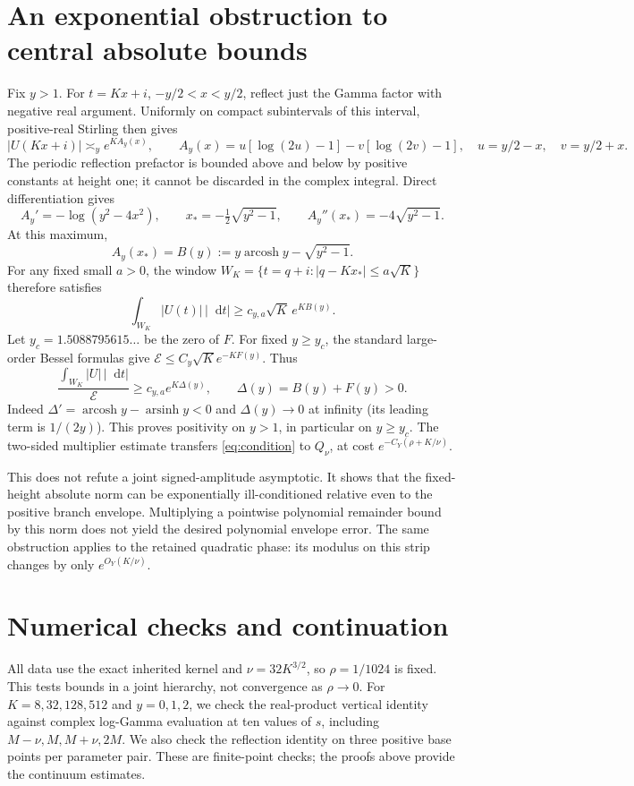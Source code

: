 \documentclass[11pt,a4paper]{article}
\newcommand{\dd}{\mathop{}\!\mathrm d}
\newcommand{\E}{\mathcal E}
\begin{document}
\section{An exponential obstruction to central absolute bounds}
Fix \(y>1\). For \(t=Kx+i\), \(-y/2<x<y/2\), reflect just the
Gamma factor with negative real argument. Uniformly on compact
subintervals of this interval, positive-real Stirling then gives
\[
 |U(Kx+i)|\asymp_y e^{KA_y(x)},\qquad
 A_y(x)=u[\log(2u)-1]-v[\log(2v)-1],
 \quad u=y/2-x,\quad v=y/2+x.
\]
The periodic reflection prefactor is bounded above and below by
positive constants at height one; it cannot be discarded in the
complex integral. Direct differentiation gives
\[
 A_y'=-\log(y^2-4x^2),\qquad
 x_*=-\tfrac12\sqrt{y^2-1},\qquad A_y''(x_*)=-4\sqrt{y^2-1}.
\]
At this maximum,
\[
 A_y(x_*)=B(y):=y\operatorname{arcosh}y-\sqrt{y^2-1}.
\]
For any fixed small \(a>0\), the window
\(W_K=\{t=q+i:|q-Kx_*|\le a\sqrt K\}\) therefore satisfies
\[
 \int_{W_K}|U(t)|\,|\dd t|\ge c_{y,a}\sqrt K\,e^{KB(y)}.
\]
Let \(y_c=1.5088795615\ldots\) be the zero of \(F\).
For fixed \(y\ge y_c\), the standard large-order Bessel formulas
\cite{Bessel} give
\(\E\le C_y\sqrt K e^{-KF(y)}\).
Thus
\begin{equation}\label{eq:condition}
 \frac{\int_{W_K}|U|\,|\dd t|}{\E}
 \ge c_{y,a}e^{K\Delta(y)},\qquad \Delta(y)=B(y)+F(y)>0.
\end{equation}
Indeed \(\Delta'=\operatorname{arcosh}y-\operatorname{arsinh}y<0\)
and \(\Delta(y)\to0\) at infinity (its leading term is \(1/(2y)\)).
This proves positivity on \(y>1\), in particular on \(y\ge y_c\).
The two-sided multiplier estimate transfers \eqref{eq:condition}
to \(Q_\nu\), at cost \(e^{-C_Y(\rho+K/\nu)}\).

This does not refute a joint signed-amplitude asymptotic.
It shows that the fixed-height absolute norm can be exponentially
ill-conditioned relative even to the positive branch envelope.
Multiplying a pointwise polynomial remainder bound by this norm
does not yield the desired polynomial envelope error.
The same obstruction applies to the retained quadratic phase:
its modulus on this strip changes by only \(e^{O_Y(K/\nu)}\).

\section{Numerical checks and continuation}
All data use the exact inherited kernel and
\(\nu=32K^{3/2}\), so \(\rho=1/1024\) is fixed.
This tests bounds in a joint hierarchy, not convergence as
\(\rho\to0\).
For \(K=8,32,128,512\) and \(y=0,1,2\), we check the real-product
vertical identity against complex log-Gamma evaluation at ten
values of \(s\), including \(M-\nu,M,M+\nu,2M\).
We also check the reflection identity on three positive base
points per parameter pair. These are finite-point checks; the
proofs above provide the continuum estimates.
\end{document}
